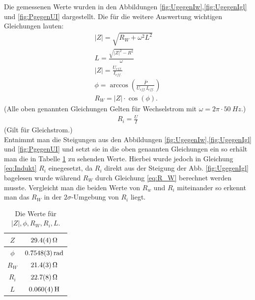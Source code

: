 Die gemessenen Werte wurden in den Abbildungen \ref{fig:UgegenIw},\ref{fig:UgegenIgl} und \ref{fig:PgegenUI} dargestellt.
Die für die weitere Auswertung wichtigen Gleichungen lauten:
\begin{align}
	|Z|=\sqrt{R_W + \omega^2L^2}\\
	L=\frac{\sqrt{|Z|^2-R^2}}{\omega}\\
	\label{eq:Indukt}
	|Z|=\frac{U_{eff.}}{I_{eff.}}\\
	\phi = \arccos\left(\frac{\bar{P}}{U_{eff.}I_{eff.}}\right)\\
	R_W=|Z|\cdot \cos(\phi)	\label{eq:R_W}.
\end{align}
(Alle oben genannten Gleichungen Gelten für Wechselstrom mit $\omega=2\pi \cdot \SI{50}{Hz}.$)
\begin{align}
	R_i=\frac{U}{I}
\end{align}
(Gilt für Gleichstrom.)\\
Entnimmt man die Steigungen aus den Abbildungen \ref{fig:UgegenIw},\ref{fig:UgegenIgl} und \ref{fig:PgegenUI} und setzt sie in die oben genannten Gleichungen ein so erhält man die in Tabelle \ref{tab:Spule} zu sehenden Werte. Hierbei wurde jedoch in Gleichung \ref{eq:Indukt} $R_i$ einegesetzt, da $R_i$ direkt aus der Steigung der Abb. \ref{fig:UgegenIgl} bagelesen wurde während $R_W$ durch Gleichung \ref{eq:R_W} berechnet werden musste. Vergleicht man die beiden Werte von $R_w$ und $R_i$ miteinander so erkennt man das  $R_W$ in der $2\sigma$-Umgebung von $R_i$ liegt. 

\begin{table}[h]
	\caption{Die Werte für $|Z|,\phi,R_W,R_i,L$.}
	\begin{tabular}{|c|c|}
		\hline
		$Z$ & $\SI{29.4+-0.4}{\ohm}$\\
		\hline
		$\phi$ & $\SI{0.7548+-0.0003}{rad}$\\
		\hline
		$R_W$ & $\SI{21.4+-0.3}{\ohm}$\\
		\hline
		$R_i$ & $\SI{22.7+-0.8}{\ohm}$\\
		\hline
		$L$ & $\SI{0,060+-0,004}{H}$\\
		\hline
	\end{tabular}
\label{tab:Spule}
\end{table}
